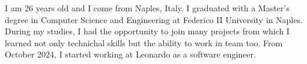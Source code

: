 

\begin{cvparagraph}

I am 26 years old and I come from Naples, Italy. I graduated with a Master's degree in Computer Science and Engineering at Federico II University in Naples. During my studies, I had the opportunity to join many projects from which I learned not only technichal skills but the ability to work in team too. From October 2024, I started working at Leonardo as a software engineer.
\end{cvparagraph}
